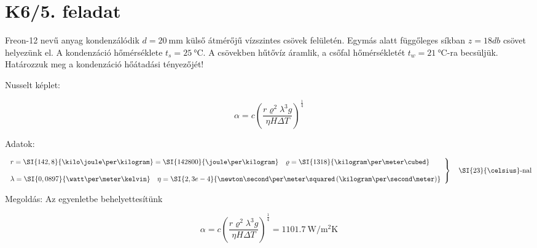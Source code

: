 \section*{K6/5. feladat}

Freon-12 nevű anyag kondenzálódik $d = \SI{20}{\milli\meter}$ külső átmérőjű vízszintes csövek felületén. Egymás alatt függőleges síkban $z = 18 db$ csövet helyezünk el. A kondenzáció hőmérséklete $t_s = \SI{25}{\celsius}$. A csövekben hűtővíz áramlik, a csőfal hőmérsékletét $t_w = \SI{21}{\celsius}$-ra becsüljük. Határozzuk meg a kondenzáció hőátadási tényezőjét!

\vspace{6mm}

Nusselt képlet:

\vspace{2mm}

\begin{equation}
\alpha = c \left(\dfrac{r \varrho^2 \lambda^3 g}{\eta H \Delta T}\right)^{\tfrac{1}{4}}
\end{equation}

\vspace{2mm}

Adatok:

\vspace{2mm}
\begin{equation}
	\label{equation:k65T}
\left.
\begin{array}{l}
r = \SI{142,8}{\kilo\joule\per\kilogram} = \SI{142800}{\joule\per\kilogram}
\quad
\varrho = \SI{1318}{\kilogram\per\meter\cubed}
\\ \\
\lambda = \SI{0,0897}{\watt\per\meter\kelvin}
\quad
\eta = \SI{2,3e-4}{\newton\second\per\meter\squared\left(\kilogram\per\second\meter)\right}
\end{array}
\right\rbrace \quad \text{\SI{23}{\celsius}-nal}
\end{equation}

\vspace{6mm}
Megoldás: Az egyenletbe behelyettesítünk

\begin{equation}
\alpha = c \left(\dfrac{r \varrho^2 \lambda^3 g}{\eta H \Delta T}\right)^{\tfrac{1}{4}} = \SI{1101,7}{\watt\per\meter\squared\kelvin}
\end{equation}

